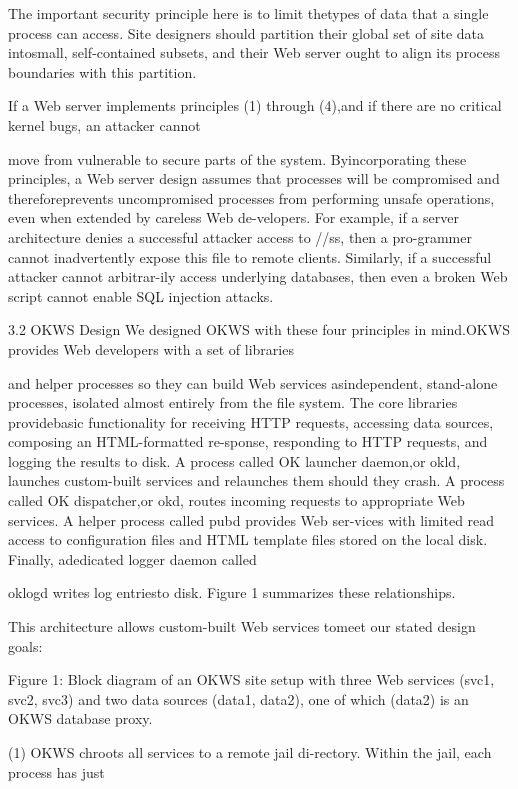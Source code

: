The important security principle here is to limit thetypes of data that a single process can access. Site designers should partition their global set of site data intosmall, self-contained subsets, and their Web server ought
to align its process boundaries with this partition.

If a Web server implements principles (1) through (4),and if there are no critical kernel bugs, an attacker cannot

move from vulnerable to secure parts of the system. Byincorporating these principles, a Web server design assumes that processes will be compromised and thereforeprevents uncompromised processes from performing unsafe operations, even when extended by careless Web de-velopers. For example, if a server architecture denies a
successful attacker access to /\Gamma \Delta \Pi /\Sigma \Upsilon ss\Phi \Xi , then a pro-grammer cannot inadvertently expose this file to remote
clients. Similarly, if a successful attacker cannot arbitrar-ily access underlying databases, then even a broken Web
script cannot enable SQL injection attacks.

3.2 OKWS Design
We designed OKWS with these four principles in mind.OKWS provides Web developers with a set of libraries

and helper processes so they can build Web services asindependent, stand-alone processes, isolated almost entirely from the file system. The core libraries providebasic functionality for receiving HTTP requests, accessing data sources, composing an HTML-formatted re-sponse, responding to HTTP requests, and logging the
results to disk. A process called OK launcher daemon,or okld, launches custom-built services and relaunches
them should they crash. A process called OK dispatcher,or okd, routes incoming requests to appropriate Web services. A helper process called pubd provides Web ser-vices with limited read access to configuration files and
HTML template files stored on the local disk. Finally, adedicated logger daemon called

oklogd writes log entriesto disk. Figure 1 summarizes these relationships.

This architecture allows custom-built Web services tomeet our stated design goals:

Figure 1: Block diagram of an OKWS site setup with three Web
services (svc1, svc2, svc3) and two data sources (data1, data2),
one of which (data2) is an OKWS database proxy.

(1) OKWS chroots all services to a remote jail di-rectory. Within the jail, each process has just

